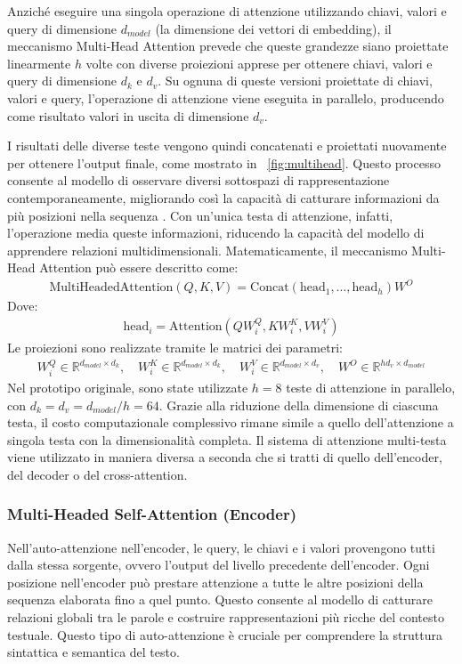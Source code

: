 Anziché eseguire una singola operazione di attenzione utilizzando chiavi, valori e query di dimensione \(d_{model}\) (la dimensione dei vettori di embedding), il meccanismo Multi-Head Attention prevede che queste grandezze siano proiettate linearmente \(h\) volte con diverse proiezioni apprese per ottenere chiavi, valori e query di dimensione \(d_k\) e \(d_v\). Su ognuna di queste versioni proiettate di chiavi, valori e query, l'operazione di attenzione viene eseguita in parallelo, producendo come risultato valori in uscita di dimensione \(d_v\).

I risultati delle diverse teste vengono quindi concatenati e proiettati nuovamente per ottenere l'output finale, come mostrato in \figurename{~\ref{fig:multihead}}. Questo processo consente al modello di osservare diversi sottospazi di rappresentazione contemporaneamente, migliorando così la capacità di catturare informazioni da più posizioni nella sequenza \cite{bertattention}. Con un'unica testa di attenzione, infatti, l'operazione media queste informazioni, riducendo la capacità del modello di apprendere relazioni multidimensionali.
Matematicamente, il meccanismo Multi-Head Attention può essere descritto come:
\begin{align*}
	\text{MultiHeadedAttention}(Q, K, V) = \text{Concat}(\text{head}_1, \ldots, \text{head}_h)W^O
\end{align*}
Dove:
\vspace{-0.25cm}
\begin{align*}
	\text{head}_i = \text{Attention}(QW_i^Q, KW_i^K, VW_i^V)
\end{align*}
Le proiezioni sono realizzate tramite le matrici dei parametri:
\begin{align*}
	W_i^Q \in \mathbb{R}^{d_{model} \times d_k}, \quad W_i^K \in \mathbb{R}^{d_{model} \times d_k}, \quad W_i^V \in \mathbb{R}^{d_{model} \times d_v}, \quad W^O \in \mathbb{R}^{hd_v \times d_{model}}
\end{align*}
Nel prototipo originale, sono state utilizzate \(h = 8\) teste di attenzione in parallelo, con \(d_k = d_v = d_{model}/h = 64\). Grazie alla riduzione della dimensione di ciascuna testa, il costo computazionale complessivo rimane simile a quello dell'attenzione a singola testa con la dimensionalità completa.
Il sistema di attenzione multi-testa viene utilizzato in maniera diversa a seconda che si tratti di quello dell'encoder, del decoder o del cross-attention.

\subsubsection{Multi-Headed Self-Attention (Encoder)}
Nell'auto-attenzione nell'encoder, le query, le chiavi e i valori provengono tutti dalla stessa sorgente, ovvero l'output del livello precedente dell'encoder. Ogni posizione nell'encoder può prestare attenzione a tutte le altre posizioni della sequenza elaborata fino a quel punto. Questo consente al modello di catturare relazioni globali tra le parole e costruire rappresentazioni più ricche del contesto testuale. Questo tipo di auto-attenzione è cruciale per comprendere la struttura sintattica e semantica del testo.

